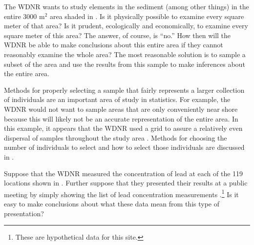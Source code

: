 \documentclass[10pt,openany]{book}\usepackage[]{graphicx}\usepackage[]{color}
\begin{document}
The WDNR wants to study elements in the sediment (among other things) in the entire 3000 m$^2$ area shaded in . Is it physically possible to examine every square meter of that area?  Is it prudent, ecologically and economically, to examine every square meter of this area?  The answer, of course, is ``no.''  How then will the WDNR be able to make conclusions about this entire area if they cannot reasonably examine the whole area?  The most reasonable solution is to sample a subset of the area and use the results from this sample to make inferences about the entire area.

Methods for properly selecting a sample that fairly represents a larger collection of individuals are an important area of study in statistics. For example, the WDNR would not want to sample areas that are only conveniently near shore because this will likely not be an accurate representation of the entire area. In this example, it appears that the WDNR used a grid to assure a relatively even dispersal of samples throughout the study area . Methods for choosing the number of individuals to select and how to select those individuals are discussed in .


Suppose that the WDNR measured the concentration of lead at each of the 119 locations shown in . Further suppose that they presented their results at a public meeting by simply showing the list of lead concentration measurements .\footnote{These are hypothetical data for this site.}  Is it easy to make conclusions about what these data mean from this type of presentation?
\end{document}
